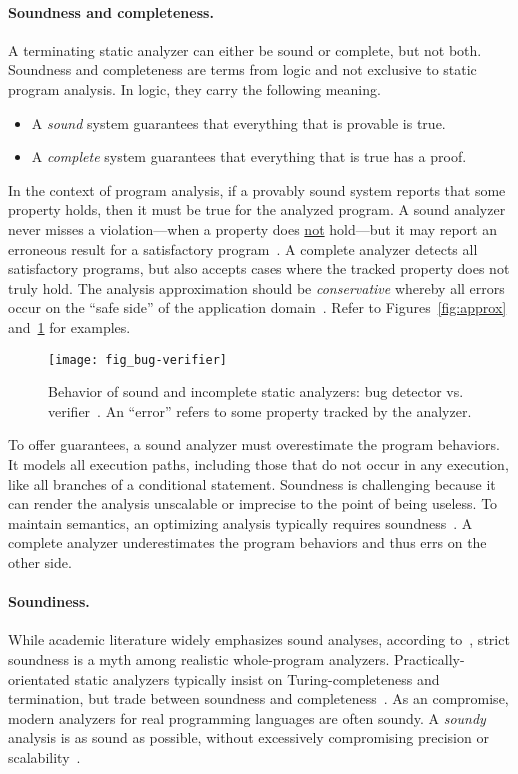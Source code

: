 \paragraph*{Soundness and completeness.}
A terminating static analyzer can either be sound or complete, but not both.
Soundness and completeness are terms from logic and not exclusive to static program analysis.
In logic, they carry the following meaning.
\begin{itemize}
\item A \emph{sound} system guarantees that everything that is provable is true.
\item A \emph{complete} system guarantees that everything that is true has a proof.
\end{itemize}
In the context of program analysis,
if a provably sound system reports that some property holds, then it must be true for the analyzed program.
A sound analyzer never misses a violation---\ie when a property does \underline{not} hold---but it may report an erroneous result for a satisfactory program~\cite{torlak2015}.
A complete analyzer detects all satisfactory programs, but also accepts cases where the tracked property does not truly hold.
The analysis approximation should be \emph{conservative}
whereby all errors occur on the \enquote{safe side} of the application domain~\cite[p. 5]{moller2023}.
Refer to Figures~\ref{fig:approx} and~\ref{fig:bug-verify} for examples.

\begin{figure}[t]
\centering
\texttt{[image: fig\_bug-verifier]}
\caption[Sound and incomplete bug detector vs. verifier]{
Behavior of sound and incomplete static analyzers: bug detector vs. verifier~\cite{moller2024}.
An \enquote{error} refers to some property tracked by the analyzer.}
\label{fig:bug-verify}
\end{figure}

To offer guarantees, a sound analyzer must overestimate the program behaviors.
It models all execution paths, including those that do not occur in any execution, like all branches of a conditional statement.
Soundness is challenging because it can render the analysis unscalable or imprecise to the point of being useless.
To maintain semantics, an optimizing analysis typically requires soundness~\cite[p. 5]{moller2023}.
A complete analyzer underestimates the program behaviors and thus errs on the other side.

\paragraph*{Soundiness.}
While academic literature widely emphasizes sound analyses, according to~\textcite{livshits2015}, strict soundness is a myth among realistic whole-program analyzers.
Practically-orientated static analyzers typically insist on Turing-completeness and termination,
but trade between soundness and completeness~\cite{moller2023,steffen2020}.
As an compromise, modern analyzers for real programming languages are often soundy.
A \emph{soundy} analysis is as sound as possible, without excessively compromising precision or scalability~\cite{livshits2015}.

